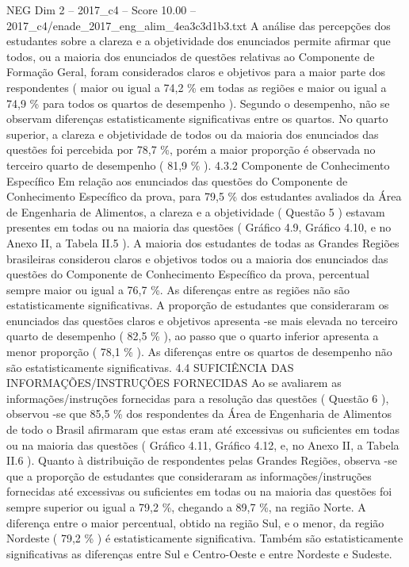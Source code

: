 \begin{textsample}{NEG Dim 2 – 2017\_c4 – Score 10.00 – 2017\_c4/enade\_2017\_eng\_alim\_4ea3c3d1b3.txt}
A análise das percepções dos estudantes sobre a clareza e a objetividade dos enunciados permite afirmar que todos, ou a maioria dos enunciados de questões relativas ao Componente de Formação Geral, foram considerados claros e objetivos para a maior parte dos respondentes ( maior ou igual a 74,2 \% em todas as regiões e maior ou igual a 74,9 \% para todos os quartos de desempenho ).
Segundo o desempenho, não se observam diferenças estatisticamente significativas entre os quartos.
No quarto superior, a clareza e objetividade de todos ou da maioria dos enunciados das questões foi percebida por 78,7 \%, porém a maior proporção é observada no terceiro quarto de desempenho ( 81,9 \% ). 4.3.2 Componente de Conhecimento Específico Em relação aos enunciados das questões do Componente de Conhecimento Específico da prova, para 79,5 \% dos estudantes avaliados da Área de Engenharia de Alimentos, a clareza e a objetividade ( Questão 5 ) estavam presentes em todas ou na maioria das questões ( Gráfico 4.9, Gráfico 4.10, e no Anexo II, a Tabela II.5 ).
A maioria dos estudantes de todas as Grandes Regiões brasileiras considerou claros e objetivos todos ou a maioria dos enunciados das questões do Componente de Conhecimento Específico da prova, percentual sempre maior ou igual a 76,7 \%.
As diferenças entre as regiões não são estatisticamente significativas.
A proporção de estudantes que consideraram os enunciados das questões claros e objetivos apresenta -se mais elevada no terceiro quarto de desempenho ( 82,5 \% ), ao passo que o quarto inferior apresenta a menor proporção ( 78,1 \% ).
As diferenças entre os quartos de desempenho não são estatisticamente significativas. 4.4 SUFICIÊNCIA DAS INFORMAÇÕES/INSTRUÇÕES FORNECIDAS Ao se avaliarem as informações/instruções fornecidas para a resolução das questões ( Questão 6 ), observou -se que 85,5 \% dos respondentes da Área de Engenharia de Alimentos de todo o Brasil afirmaram que estas eram até excessivas ou suficientes em todas ou na maioria das questões ( Gráfico 4.11, Gráfico 4.12, e, no Anexo II, a Tabela II.6 ).
Quanto à distribuição de respondentes pelas Grandes Regiões, observa -se que a proporção de estudantes que consideraram as informações/instruções fornecidas até excessivas ou suficientes em todas ou na maioria das questões foi sempre superior ou igual a 79,2 \%, chegando a 89,7 \%, na região Norte.
A diferença entre o maior percentual, obtido na região Sul, e o menor, da região Nordeste ( 79,2 \% ) é estatisticamente significativa.
Também são estatisticamente significativas as diferenças entre Sul e Centro-Oeste e entre Nordeste e Sudeste.

\end{textsample}
